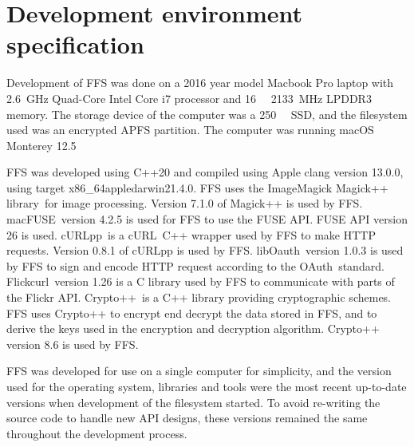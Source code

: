 \section{Development environment specification}
\label{sec:dev_env}
Development of FFS was done on a 2016 year model Macbook Pro laptop with \SI{2.6}{\giga\hertz} Quad-Core Intel Core i7 processor and \SI{16}{\giga\byte} \SI{2133}{\mega\hertz} LPDDR3 memory. The storage device of the computer was a \SI{250}{\giga\byte} SSD, and the filesystem used was an encrypted APFS partition. The computer was running macOS Monterey 12.5

FFS was developed using C++20 and compiled using Apple clang version 13.0.0, using target x86\_64\-apple\-darwin21.4.0. FFS uses the ImageMagick Magick++ library\,\cite{ImageMagick2022} for image processing. Version 7.1.0 of Magick++ is used by FFS. macFUSE\,\cite{HomeMacFUSE} version 4.2.5 is used for FFS to use the FUSE API. FUSE API version 26 is used. cURLpp\,\cite{barrette-lapierreCURLpp2022} is a cURL\,\cite{CurlCurl2022} C++ wrapper used by FFS to make HTTP requests. Version 0.8.1 of cURLpp is used by FFS. libOauth\,\cite{Liboauth} version 1.0.3 is used by FFS to sign and encode HTTP request according to the OAuth\,\cite{barrette-lapierreCURLpp2022} standard. Flickcurl\,\cite{beckettFlickcurlLibraryFlickr} version 1.26 is a C library used by FFS to communicate with parts of the Flickr API. Crypto++\,\cite{CryptoLibraryFree} is a C++ library providing cryptographic schemes. FFS uses Crypto++ to encrypt end decrypt the data stored in FFS, and to derive the keys used in the encryption and decryption algorithm. Crypto++ version 8.6 is used by FFS.

FFS was developed for use on a single computer for simplicity, and the version used for the operating system, libraries and tools were the most recent up-to-date versions when development of the filesystem started. To avoid re-writing the source code to handle new API designs, these versions remained the same throughout the development process.